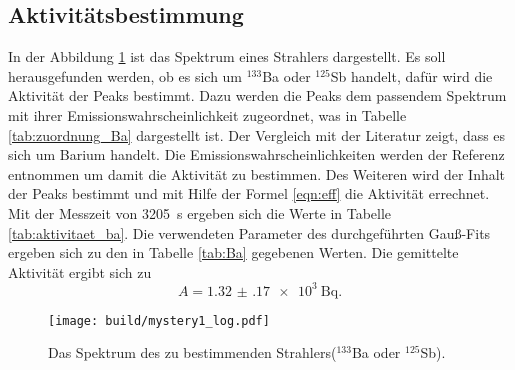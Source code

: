 \subsection{Aktivitätsbestimmung}
\label{sec:Aktiv}
In der Abbildung \ref{fig:mystery1} ist das Spektrum eines Strahlers dargestellt. Es soll herausgefunden werden,
ob es sich um ${}^{133}$Ba oder ${}^{125}$Sb handelt, dafür wird die Aktivität der Peaks bestimmt. Dazu werden
die Peaks dem passendem Spektrum mit ihrer Emissionswahrscheinlichkeit zugeordnet, was in Tabelle \ref{tab:zuordnung_Ba}
dargestellt ist. Der Vergleich mit der Literatur \cite{referenz1} zeigt, dass es sich um Barium handelt. 
Die Emissionswahrscheinlichkeiten werden der Referenz \cite{referenz1} entnommen um damit die Aktivität zu bestimmen. 
Des Weiteren wird der Inhalt der Peaks bestimmt und mit Hilfe der Formel 
\ref{eqn:eff} die Aktivität errechnet. Mit der Messzeit von \SI{3205}{\second} ergeben sich die Werte in Tabelle 
\ref{tab:aktivitaet_ba}. Die verwendeten Parameter des durchgeführten Gauß-Fits ergeben sich zu den in Tabelle \ref{tab:Ba} 
gegebenen Werten. Die gemittelte Aktivität ergibt sich zu
\begin{equation*}
  A = \SI{1.32(17)e3}{\becquerel}.
\end{equation*}
 


\begin{figure}[htb]
 \centering
 \texttt{[image: build/mystery1\_log.pdf]}
 \caption{Das Spektrum des zu bestimmenden Strahlers(${}^{133}$Ba oder ${}^{125}$Sb).}
 \label{fig:mystery1}
\end{figure}
\FloatBarrier



